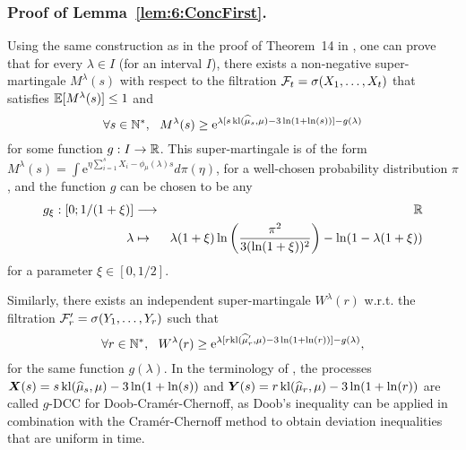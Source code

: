\subsubsection{Proof of Lemma~\ref{lem:6:ConcFirst}.}
\label{app:6:proofConcFirst}
%
Using the same construction as in the proof of Theorem~14 in \cite{KK18Martingales}, one can prove that for every $\lambda \in I$ (for an interval $I$), there exists a non-negative super-martingale $M^\lambda (s)$ with respect to the filtration $\mathcal{F}_t = \sigma(X_1,\dots,X_t)$ that satisfies $\mathbb{E}[M^\lambda(s)] \leq 1$ and
\[\forall s \in \mathbb{N}^*, \ \ M^\lambda (s) \geq \mathrm{e}^{\lambda [s \, \mathrm{kl}(\widehat{\mu}_s,\mu) - 3\ln(1+\ln(s))] - g(\lambda)}\]
for some function $g : I \rightarrow \mathbb{R}$. This super-martingale is of the form
$M^\lambda (s) = \int \mathrm{e}^{\eta\sum_{i=1}^s X_i - \phi_\mu(\lambda)s} d\pi(\eta)$,
for a well-chosen probability distribution $\pi$, and the function $g$ can be chosen to be any
\begin{eqnarray*}
    g_{\xi} : \left[0; 1/(1+\xi)\right] & \longrightarrow & \mathbb{R} \\
    \lambda & \mapsto & \lambda(1+\xi) \ln \left(\frac{\pi^2}{3(\ln(1+\xi))^2}\right) -  \ln(1 - \lambda(1 + \xi))
\end{eqnarray*}
for a parameter $\xi \in [0,1/2]$.

Similarly, there exists an independent super-martingale $W^\lambda (r)$ w.r.t. the filtration $\mathcal{F}_r' = \sigma(Y_1,\dots,Y_r)$ such that
\[\forall r \in \mathbb{N}^*, \ \ W^\lambda (r) \geq \mathrm{e}^{\lambda [r\mathrm{kl}(\widehat{\mu}'_r,\mu) - 3\ln(1+\ln(r))] - g(\lambda)},\]
for the same function $g(\lambda)$.
In the terminology of \cite{KK18Martingales}, the processes $\bm{X}(s) = s \, \mathrm{kl}(\widehat{\mu}_s,\mu) - 3\ln(1+\ln(s))$ and $\bm{Y}(s) = r \, \mathrm{kl}(\widehat{\mu}_r,\mu) - 3\ln(1+\ln(r))$ are called $g$-DCC for Doob-Cram\'er-Chernoff, as Doob's inequality can be applied in combination with the Cram\'er-Chernoff method to obtain deviation inequalities that are uniform in time.

